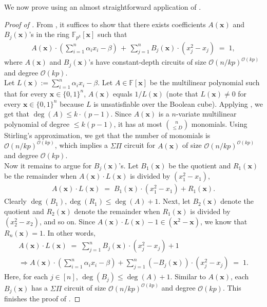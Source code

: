 \documentclass[11pt]{article}
\newcommand{\Boo}{\{0,1 \}}
\newcommand{\bigO}{\mathcal{O}}
\newcommand{\paren}[1]{\left( #1 \right)}
\newcommand{\F}{\mathbb{F}}
\begin{document}
\noindent
We now prove  using an almost straightforward application of .\\

\begin{proof}[Proof of ]
From , it suffices to show that there exists coefficients $A(\mathbf{x})$ and $B_{j}(\mathbf{x})$'s in the ring $\F_{p^{k}}[\mathbf{x}]$ such that
\begin{align*}
    A(\mathbf{x}) \cdot \paren{\sum_{i=1}^{n} \alpha_{i} x_{i} - \beta} \, + \, \sum_{j=1}^{n} B_{j}(\mathbf{x}) \cdot (x_{j}^{2} - x_{j}) \; = \; 1,
\end{align*}
where $A(\mathbf{x})$ and $B_{j}(\mathbf{x})$'s have constant-depth circuits of size $\bigO(n/kp)^{\bigO(kp)}$ and degree $\bigO(kp)$.\\

Let $L(\mathbf{x}) := \sum_{i=1}^{n} \alpha_{i} x_{i} - \beta$. Let $A \in \F[\mathbf{x}]$ be the multilinear polynomial such that for every $\mathbf{x} \in \Boo^{n}$, $A(\mathbf{x})$ equals $1/L(\mathbf{x})$ (note that $L(\mathbf{x}) \neq 0$ for every $\mathbf{x} \in \Boo^{n}$ because $L$ is unsatisfiable over the Boolean cube). Applying , we get that $\deg(A) \leq k\cdot(p-1)$.\newline
Since $A(\mathbf{x})$ is a $n$-variate multilinear polynomial of degree $\leq k(p-1)$, it has at most $\binom{n}{\leq D}$ monomials. Using Stirling's approximation, we get that the number of monomials is $\bigO(n/kp)^{\bigO(kp)}$, which implies a $\Sigma \Pi$ circuit for $A(\mathbf{x})$ of size $\bigO(n/kp)^{\bigO(kp)}$ and degree $\bigO(kp)$.\\

\noindent
Now it remains to argue for $B_{j}(\mathbf{x})$'s. Let $B_{1}(\mathbf{x})$ be the quotient and $R_{1}(\mathbf{x})$ be the remainder when $A(\mathbf{x}) \cdot L(\mathbf{x})$ is divided by $(x_{1}^{2}-x_{1})$,
\begin{align*}
    A(\mathbf{x}) \cdot L(\mathbf{x}) \; = \; B_{1}(\mathbf{x}) \cdot (x_{1}^{2} - x_{1}) + R_{1}(\mathbf{x}).
\end{align*}
Clearly $\deg(B_{1}), \deg(R_{1}) \leq \deg(A) + 1$. Next, let $B_{2}(\mathbf{x})$ denote the quotient and $R_{2}(\mathbf{x})$ denote the remainder when $R_{1}(\mathbf{x})$ is divided by $(x_{2}^{2} - x_{2})$, and so on. Since $A(\mathbf{x}) \cdot L(\mathbf{x}) - 1 \in (\mathbf{x}^{2} - \mathbf{x})$, we know that $R_{n}(\mathbf{x}) = 1$. In other words,
\begin{align*}
    A(\mathbf{x}) \cdot L(\mathbf{x}) \; = \; \sum_{j=1}^{n} B_{j}(\mathbf{x}) \cdot (x_{j}^{2} - x_{j}) + 1  \\
    \Rightarrow A(\mathbf{x}) \cdot \paren{\sum_{i=1}^{n} \alpha_{i} x_{i} - \beta} + \sum_{j=1}^{n} (-B_{j}(\mathbf{x})) \cdot (x_{j}^{2} - x_{j}) \; = \; 1.
\end{align*}
Here, for each $j \in [n]$, $\deg(B_{j})\leq \deg(A) + 1$. Similar to $A(\mathbf{x})$, each $B_{j}(\mathbf{x})$ has a $\Sigma \Pi$ circuit of size $\bigO(n/kp)^{\bigO(kp)}$ and degree $\bigO(kp)$. This finishes the proof of .
\end{proof}
\end{document}
